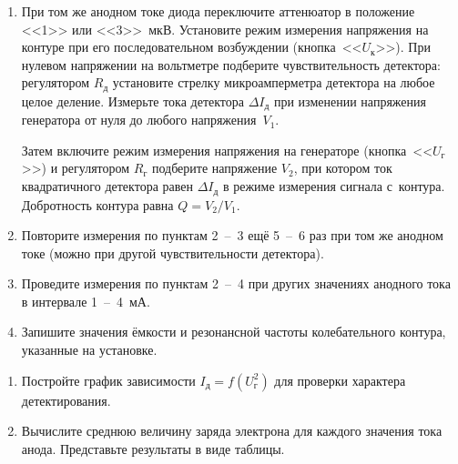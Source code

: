 \begin{lab:task}
\begin{enumerate}
С помощью регулятора $R_{\text{г}}$ и аттенюатора (пределы <<30>>, <<100>> или <<300>>~мкВ) установите ~$I_{\text{д}}$, которое было выбрано в режиме измерения шума. Регулятор $R_{\text{д}}$ во время этой процедуры, конечно, трогать
нельзя. Отсчитанное по вольтметру с аттенюатором напряжение~$U_{\text{эфф}}$ равно корню квадратному из среднего квадрата
напряжения шумов.


	\item При том же анодном токе диода переключите аттенюатор в положение <<1>> или <<3>>~мкВ. Установите режим измерения
напряжения на контуре при его последовательном возбуждении (кнопка~<<$U_{\text{к}}$>>). При нулевом напряжении на вольтметре
подберите чувствительность детектора: регулятором $R_{\text{д}}$ установите стрелку микроамперметра детектора на любое целое
деление. Измерьте  тока детектора $\Delta I_{\text{д}}$ при изменении напряжения генератора от нуля до любого
напряжения~$V_1$.

Затем включите режим измерения напряжения на генераторе (кнопка~<<$U_{\text{г}}$>>) и регулятором $R_{\text{г}}$ подберите напряжение
$V_2$, при котором ток квадратичного детектора равен  $\Delta I_{\text{д}}$ в режиме измерения сигнала с~контура.
Добротность контура равна $Q=V_2/V_1$.

	\item Повторите измерения по пунктам 2~--~3 ещё 5~--~6 раз при том же анодном токе (можно при другой
чувствительности детектора).

	\item Проведите измерения по пунктам 2~--~4 при других значениях анодного тока в интервале 1~--~4~мА.

	\item Запишите значения ёмкости и резонансной частоты колебательного контура, указанные на установке.
	
\end{enumerate}

\begin{enumerate}

	\item Постройте график зависимости $I_{\text{д}}=f(U^2_{\text{г}})$ для проверки характера детектирования.

	\item Вычислите среднюю величину заряда электрона для каждого значения тока анода. Представьте результаты в виде таблицы.


\end{enumerate}
\end{lab:task}
